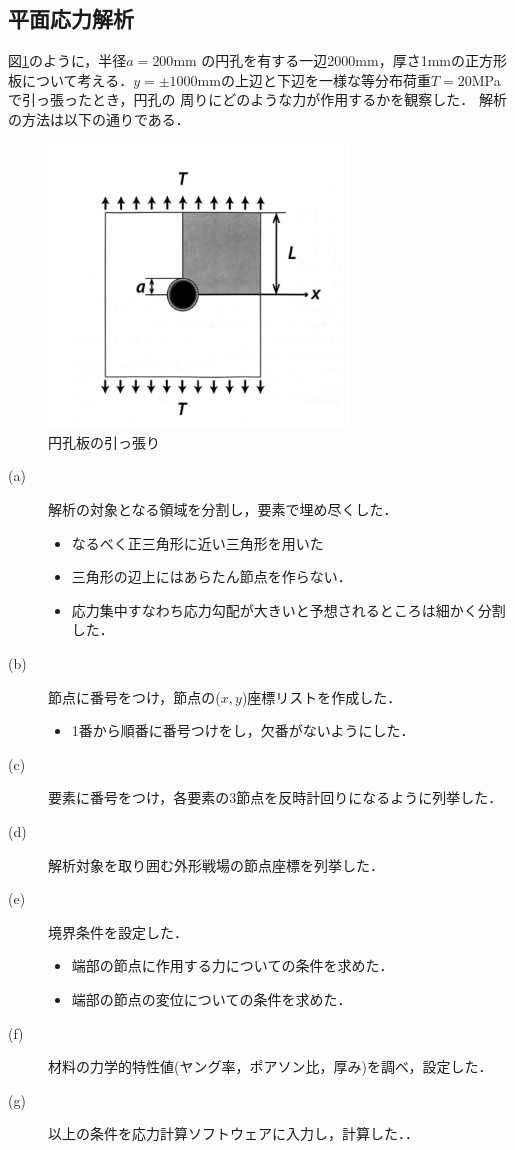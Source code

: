 \documentclass[a4paper,11pt,uplatex]{jsarticle}
\begin{document}
\subsection{平面応力解析}
図\ref{板}のように，半径$a=200$mm の円孔を有する一辺2000mm，厚さ1mmの正方形板について考える．$y = \pm 1000$mmの上辺と下辺を一様な等分布荷重$T=20$MPaで引っ張ったとき，円孔の
周りにどのような力が作用するかを観察した．
解析の方法は以下の通りである．

\begin{figure}[H]
  \begin{center}
    \includegraphics[width = 8cm]{画像/板.png}
    \caption{円孔板の引っ張り}
    \label{板}
  \end{center}
\end{figure}

\begin{description}
  \item[(a)] 解析の対象となる領域を分割し，要素で埋め尽くした．
  \begin{itemize}
    \item なるべく正三角形に近い三角形を用いた
    \item 三角形の辺上にはあらたん節点を作らない．
    \item 応力集中すなわち応力勾配が大きいと予想されるところは細かく分割した．
  \end{itemize}
  \item[(b)] 節点に番号をつけ，節点の($x,y$)座標リストを作成した．
  \begin{itemize}
    \item 1番から順番に番号つけをし，欠番がないようにした．
  \end{itemize}
  \item[(c)]要素に番号をつけ，各要素の3節点を反時計回りになるように列挙した．
  \item[(d)]解析対象を取り囲む外形戦場の節点座標を列挙した．
  \item[(e)]境界条件を設定した．
  \begin{itemize}
    \item 端部の節点に作用する力についての条件を求めた．
    \item 端部の節点の変位についての条件を求めた．
  \end{itemize}
  \item[(f)]材料の力学的特性値(ヤング率，ポアソン比，厚み)を調べ，設定した．
  \item[(g)]以上の条件を応力計算ソフトウェアに入力し，計算した．．
\end{description}
\end{document}
